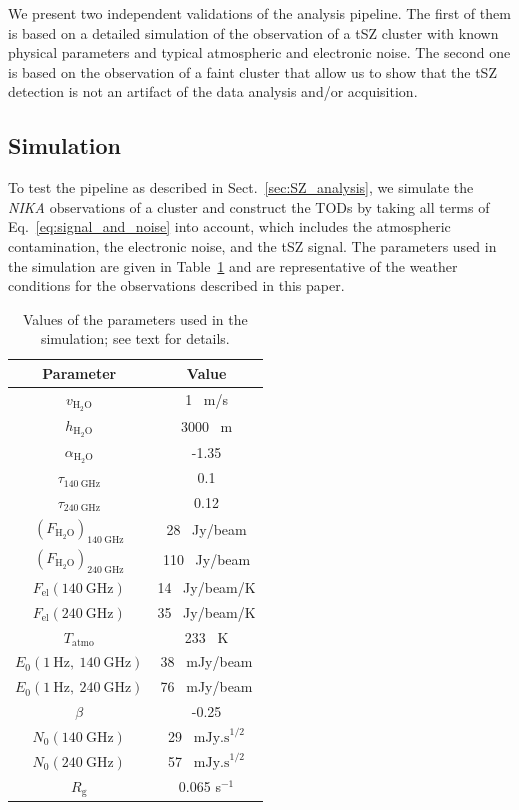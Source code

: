 We present two independent validations of the analysis pipeline. The first of them is based on a detailed simulation of the observation of a tSZ cluster with known physical parameters and typical atmospheric and electronic noise. The second one is based on the observation of a faint cluster that allow us to show that the tSZ detection is not an artifact of the data analysis and/or acquisition. 

 \subsection{Simulation}
 \label{sec:simu}	
To test the pipeline as described in Sect.~\ref{sec:SZ_analysis}, we simulate the {\it NIKA} observations of a cluster and construct the TODs by taking all terms of Eq.~\ref{eq:signal_and_noise} into account, which includes the atmospheric contamination, the electronic noise, and the tSZ signal. The parameters used in the simulation are given in Table~\ref{tab:table_param_simu} and are representative of the weather conditions for the observations described in this paper.
\begin{table}
\begin{center}
\begin{tabular}{cc}
\hline
\hline
Parameter & Value \\
\hline
$v_{\mathrm{H}_2\mathrm{O}}$ & 1 \ m/s\\
$h_{\mathrm{H}_2\mathrm{O}}$ & 3000 \ m \\
$\alpha_{\mathrm{H}_2\mathrm{O}}$ & -1.35 \\
$\tau_{140 \ \mathrm{GHz}}$ & 0.1 \\
$\tau_{240 \ \mathrm{GHz}}$ & 0.12 \\
$\left({F_{\mathrm{H}_2\mathrm{O}}}\right)_{140 \ \mathrm{GHz}}$ & 28 \ Jy/beam \\
$\left({F_{\mathrm{H}_2\mathrm{O}}}\right)_{240 \ \mathrm{GHz}}$ & 110 \ Jy/beam \\
$F_{\mathrm{el}} (140 \ \mathrm{GHz})$ & 14 \ Jy/beam/K \\
$F_{\mathrm{el}} (240 \ \mathrm{GHz})$ & 35 \ Jy/beam/K \\
$T_{\mathrm{atmo}}$ & 233 \ K \\
$E_0(1 \ \mathrm{Hz,} \ 140 \ \mathrm{GHz})$ & 38 \ mJy/beam \\
$E_0(1 \ \mathrm{Hz,} \ 240 \ \mathrm{GHz})$ & 76 \ mJy/beam \\
$\beta$ & -0.25 \\ 
$N_0 (140 \ \mathrm{GHz})$ & 29 \ $\mathrm{mJy.s}^{1/2}$ \\
$N_0 (240 \ \mathrm{GHz})$ & 57 \ $\mathrm{mJy.s}^{1/2}$ \\ 
$R_{\mathrm{g}}$ & 0.065 s$^{-1}$ \\
\hline
\end{tabular}
\end{center}
\caption{Values of the parameters used in the simulation; see text for details.}
\label{tab:table_param_simu}
\end{table}

